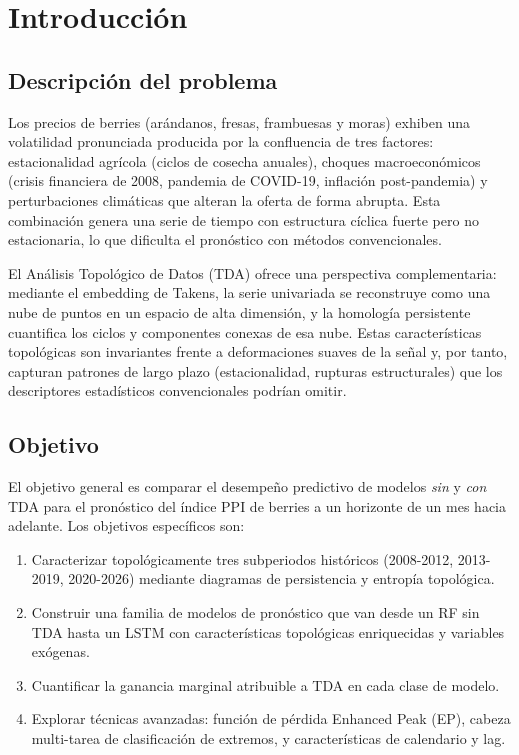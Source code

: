 \documentclass[12pt, a4paper]{article}
\begin{document}
\tableofcontents
\newpage

\newpage

\section{Introducción}

\subsection{Descripción del problema}

Los precios de berries (arándanos, fresas, frambuesas y moras) exhiben una volatilidad pronunciada
producida por la confluencia de tres factores: estacionalidad agrícola (ciclos de cosecha anuales),
choques macroeconómicos (crisis financiera de 2008, pandemia de COVID-19, inflación post-pandemia)
y perturbaciones climáticas que alteran la oferta de forma abrupta. Esta combinación genera una
serie de tiempo con estructura cíclica fuerte pero no estacionaria, lo que dificulta el pronóstico
con métodos convencionales.

El Análisis Topológico de Datos (TDA) ofrece una perspectiva complementaria: mediante el embedding
de Takens, la serie univariada se reconstruye como una nube de puntos en un espacio de alta dimensión,
y la homología persistente cuantifica los ciclos y componentes conexas de esa nube. Estas
características topológicas son invariantes frente a deformaciones suaves de la señal y, por tanto,
capturan patrones de largo plazo (estacionalidad, rupturas estructurales) que los descriptores
estadísticos convencionales podrían omitir.

\subsection{Objetivo}

El objetivo general es comparar el desempeño predictivo de modelos \textit{sin} y \textit{con} TDA
para el pronóstico del índice PPI de berries a un horizonte de un mes hacia adelante. Los objetivos
específicos son:

\begin{enumerate}[leftmargin=1.5em]
  \item Caracterizar topológicamente tres subperiodos históricos (2008-2012, 2013-2019, 2020-2026)
        mediante diagramas de persistencia y entropía topológica.
  \item Construir una familia de modelos de pronóstico que van desde un RF sin TDA hasta un LSTM
        con características topológicas enriquecidas y variables exógenas.
  \item Cuantificar la ganancia marginal atribuible a TDA en cada clase de modelo.
  \item Explorar técnicas avanzadas: función de pérdida Enhanced Peak (EP), cabeza multi-tarea de
        clasificación de extremos, y características de calendario y lag.
\end{enumerate}
\end{document}
